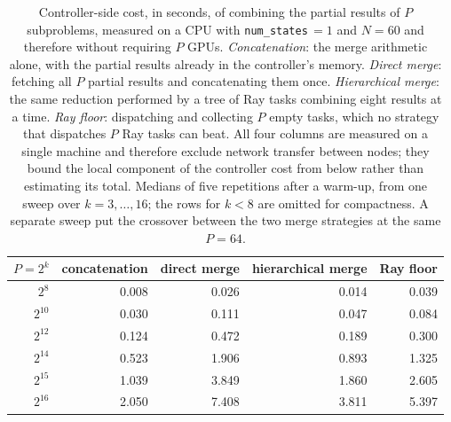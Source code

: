 \documentclass[12pt,a4paper]{elsarticle}
\begin{document}
\begin{table}[H]
\centering
\small
\begin{tabular}{|r|r|r|r|r|}
\hline
$P=2^{k}$ & concatenation & direct merge & hierarchical merge & Ray floor \\
\hline
$2^{8}$  & 0.008 & 0.026 & 0.014 & 0.039 \\
$2^{10}$ & 0.030 & 0.111 & 0.047 & 0.084 \\
$2^{12}$ & 0.124 & 0.472 & 0.189 & 0.300 \\
$2^{14}$ & 0.523 & 1.906 & 0.893 & 1.325 \\
$2^{15}$ & 1.039 & 3.849 & 1.860 & 2.605 \\
$2^{16}$ & 2.050 & 7.408 & 3.811 & 5.397 \\
\hline
\end{tabular}
\caption{Controller-side cost, in seconds, of combining the partial results of $P$
subproblems, measured on a CPU with \texttt{num\_states}$\,=1$ and $N=60$ and therefore
without requiring $P$ GPUs. \emph{Concatenation}: the merge arithmetic alone, with the partial
results already in the controller's memory. \emph{Direct merge}: fetching all $P$ partial
results and concatenating them once. \emph{Hierarchical merge}: the same reduction performed by
a tree of Ray tasks combining eight results at a time. \emph{Ray floor}: dispatching and
collecting $P$ empty tasks, which no strategy that dispatches $P$ Ray tasks can beat. All four columns are
measured on a single machine and therefore exclude network transfer between nodes; they bound
the local component of the controller cost from below rather than estimating its total. Medians of five
repetitions after a warm-up, from one sweep over $k=3,\dots,16$; the rows for $k<8$ are omitted
for compactness. A separate sweep put the crossover between the two merge strategies at the
same $P=64$.}
\label{tab:controller}
\end{table}
\end{document}
